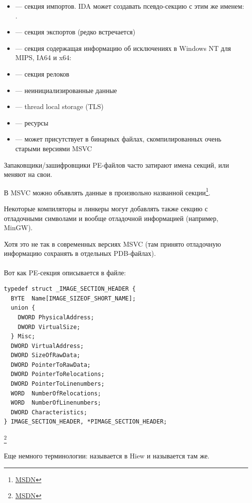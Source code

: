 \begin{itemize}
\item {} --- секция импортов. \ac{IDA} может создавать псевдо-секцию с этим же именем: .
\item {} --- секция экспортов (редко встречается)
\item {} --- секция содержащая информацию об исключениях в Windows NT для MIPS, \ac{IA64} и x64: 
\item {} --- секция релоков
\item {} --- неинициализированные данные
\item {} --- thread local storage (\ac{TLS})
\item {} --- ресурсы
\item {} --- может присутствует в бинарных файлах, скомпилированных очень старыми версиями MSVC
\end{itemize}

Запаковщики/зашифровщики PE-файлов часто затирают имена секций, или меняют на свои.

В \ac{MSVC} можно объявлять данные в произвольно названной секции\footnote{\href{http://go.yurichev.com/17047}{MSDN}}.

Некоторые компиляторы и линкеры могут добавлять также секцию с отладочными символами 
и вообще отладочной информацией (например, MinGW).

Хотя это не так в современных версиях \ac{MSVC} (там принято отладочную информацию сохранять в отдельных \gls{PDB}-файлах).\\
\\
Вот как PE-секция описывается в файле:

\begin{lstlisting}
typedef struct _IMAGE_SECTION_HEADER {
  BYTE  Name[IMAGE_SIZEOF_SHORT_NAME];
  union {
    DWORD PhysicalAddress;
    DWORD VirtualSize;
  } Misc;
  DWORD VirtualAddress;
  DWORD SizeOfRawData;
  DWORD PointerToRawData;
  DWORD PointerToRelocations;
  DWORD PointerToLinenumbers;
  WORD  NumberOfRelocations;
  WORD  NumberOfLinenumbers;
  DWORD Characteristics;
} IMAGE_SECTION_HEADER, *PIMAGE_SECTION_HEADER;
\end{lstlisting}
\footnote{\href{http://go.yurichev.com/17048}{MSDN}}

Еще немного терминологии:  называется  в Hiew и  называется  там же.

